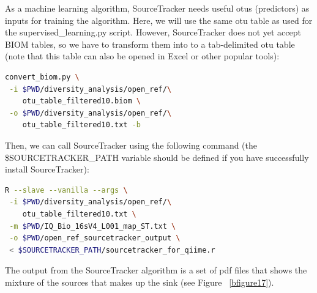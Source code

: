 As a machine learning algorithm, SourceTracker needs useful \gls{otu}s (predictors) as inputs for training the algorithm.
Here, we will use the same \gls{otu} table as used for the supervised\_learning.py script. However, SourceTracker does not
yet accept BIOM tables, so we have to transform them into to a tab-delimited \gls{otu} table (note that this table can also
be opened in Excel or other popular tools):

\begin{lstlisting}[language=bash]
convert_biom.py \
 -i $PWD/diversity_analysis/open_ref/\
    otu_table_filtered10.biom \
 -o $PWD/diversity_analysis/open_ref/\
    otu_table_filtered10.txt -b
\end{lstlisting}

Then, we \hspace{0.01cm} can \hspace{0.01cm} call \hspace{0.01cm} SourceTracker \hspace{0.01cm} using \hspace{0.01cm} the following
command (the \$SOURCETRACKER\_PATH variable should be defined if
you have successfully install SourceTracker):

\begin{lstlisting}[language=bash]
R --slave --vanilla --args \
 -i $PWD/diversity_analysis/open_ref/\
    otu_table_filtered10.txt \
 -m $PWD/IQ_Bio_16sV4_L001_map_ST.txt \
 -o $PWD/open_ref_sourcetracker_output \
 < $SOURCETRACKER_PATH/sourcetracker_for_qiime.r
\end{lstlisting}

The output from the SourceTracker algorithm is a set of pdf files that shows the mixture of
the sources that makes up the sink (see Figure ~\ref{bfigure17}).

